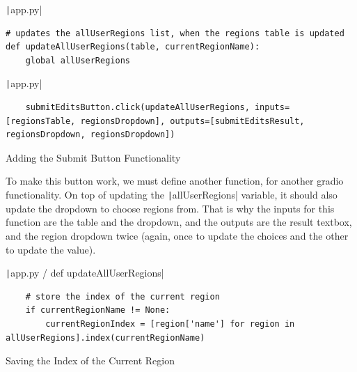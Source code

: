 \documentclass[12pt]{report}
\newcommand{\pil}[1]{\protect\texttt|#1|}
\begin{document}
\begin{center}
\end{center}

\begin{listing}[H]
\pil{app.py}
\begin{verbatim}
# updates the allUserRegions list, when the regions table is updated
def updateAllUserRegions(table, currentRegionName):
    global allUserRegions
\end{verbatim}
\pil{app.py}
\begin{verbatim}
    submitEditsButton.click(updateAllUserRegions, inputs=[regionsTable, regionsDropdown], outputs=[submitEditsResult, regionsDropdown, regionsDropdown])
\end{verbatim}
\caption{Adding the Submit Button Functionality}\label{cs:submitButtonFunctionality}
\end{listing}

To make this button work, we must define another function, for another gradio functionality. On top of updating the \pil{allUserRegions} variable, it should also update the dropdown to choose regions from. That is why the inputs for this function are the table and the dropdown, and the outputs are the result textbox, and the region dropdown twice (again, once to update the choices and the other to update the value).

\begin{listing}[H]
\pil{app.py / def updateAllUserRegions}
\begin{verbatim}
    # store the index of the current region
    if currentRegionName != None:
        currentRegionIndex = [region['name'] for region in allUserRegions].index(currentRegionName)
\end{verbatim}
\caption{Saving the Index of the Current Region}\label{cs:saveIndex}
\end{listing}
\end{document}
